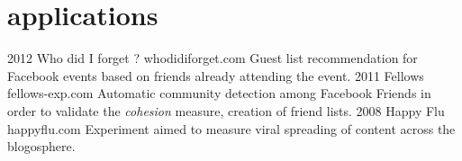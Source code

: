 \documentclass{cv}
\begin{document}
\section{applications}

\begin{entrylist}
  \entry
    {2012}
    {Who did I forget ?}
    {whodidiforget.com}
    {Guest list recommendation for Facebook events based on friends already attending the event.}
  \entry
    {2011}
    {Fellows}
    {fellows-exp.com}
    {Automatic community detection among Facebook Friends in order to validate the \emph{cohesion} measure, creation of friend lists.}
  \entry
    {2008}
    {Happy Flu}
    {happyflu.com}
    {Experiment aimed to measure viral spreading of content across the blogosphere.}
\end{entrylist}
\end{document}
